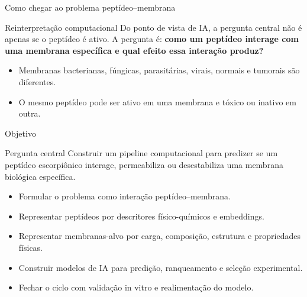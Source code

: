 \documentclass[aspectratio=169,10pt]{beamer}
\begin{document}
\begin{frame}{Como chegar ao problema peptídeo--membrana}
\begin{center}
\end{center}

\vspace{0.25cm}
\begin{block}{Reinterpretação computacional}
Do ponto de vista de IA, a pergunta central não é apenas se o peptídeo é ativo. A pergunta é: \textbf{como um peptídeo interage com uma membrana específica e qual efeito essa interação produz?}
\end{block}

\vspace{0.15cm}
\begin{itemize}
  \item Membranas bacterianas, fúngicas, parasitárias, virais, normais e tumorais são diferentes.
  \item O mesmo peptídeo pode ser ativo em uma membrana e tóxico ou inativo em outra.
\end{itemize}
\end{frame}

\begin{frame}{Objetivo}
\begin{block}{Pergunta central}
Construir um pipeline computacional para predizer se um peptídeo escorpiônico interage, permeabiliza ou desestabiliza uma membrana biológica específica.
\end{block}

\vspace{0.2cm}
\begin{itemize}
  \item Formular o problema como \alert{interação peptídeo--membrana}.
  \item Representar peptídeos por descritores físico-químicos e embeddings.
  \item Representar membranas-alvo por carga, composição, estrutura e propriedades físicas.
  \item Construir modelos de IA para predição, ranqueamento e seleção experimental.
  \item Fechar o ciclo com validação in vitro e realimentação do modelo.
\end{itemize}
\end{frame}
\end{document}
